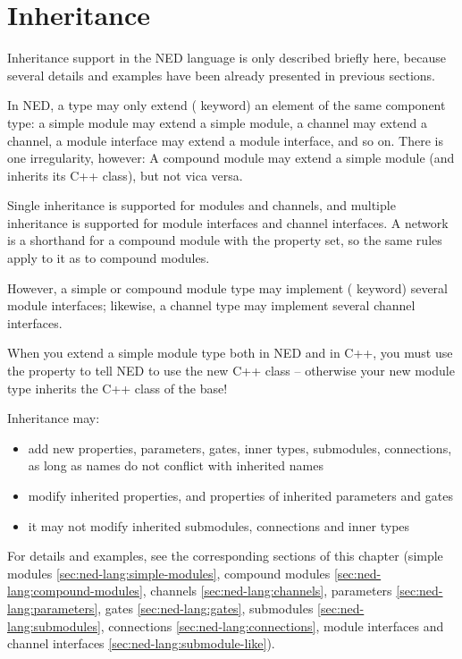 \section{Inheritance}
\label{sec:ned-lang:inheritance}

Inheritance support in the NED language is only described briefly here,
because several details and examples have been already presented in
previous sections.

In NED, a type may only extend ( keyword) an element of
the same component type: a simple module may extend a simple module, a
channel may extend a channel, a module interface may extend a module
interface, and so on. There is one irregularity, however: A compound module
may extend a simple module (and inherits its C++ class), but not vica
versa.

Single inheritance is supported for modules and channels, and multiple inheritance
is supported for module interfaces and channel interfaces. A network is a
shorthand for a compound module with the  property set, so
the same rules apply to it as to compound modules.

However, a simple or compound module type may implement (
keyword) several module interfaces; likewise, a channel type may implement
several channel interfaces.

\begin{important}
    When you extend a simple module type both in NED and in C++, you must
    use the  property to tell NED to use the new C++ class --
    otherwise your new module type inherits the C++ class of the base!
\end{important}

Inheritance may:
\begin{itemize}
    \item add new properties, parameters, gates, inner types, submodules,
          connections, as long as names do not conflict with inherited names
    \item modify inherited properties, and properties of inherited parameters and
          gates
    \item it may not modify inherited submodules, connections and inner types
\end{itemize}

For details and examples, see the corresponding sections of this chapter
(simple modules \ref{sec:ned-lang:simple-modules},
compound modules \ref{sec:ned-lang:compound-modules},
channels \ref{sec:ned-lang:channels},
parameters \ref{sec:ned-lang:parameters},
gates \ref{sec:ned-lang:gates},
submodules \ref{sec:ned-lang:submodules},
connections \ref{sec:ned-lang:connections},
module interfaces and channel interfaces \ref{sec:ned-lang:submodule-like}).



